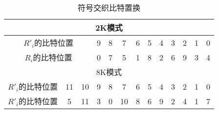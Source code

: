 \begin{table}[!htbp]
	\centering
	\caption{符号交织比特置换}
	\begin{tabular}{|c|c|c|c|c|c|c|c|c|c|c|c|c|}
	\hline\hline
	\multicolumn{13}{|c|}{2K模式} \\
	\hline
	\multicolumn{3}{|c|}{$R'_i$的比特位置} & 9 & 8 & 7 & 6 & 5 & 4 & 3 & 2 & 1 & 0 \\
	\hline
	\multicolumn{3}{|c|}{$R_i$的比特位置} & 0 & 7 & 5 & 1 & 8 & 2 & 6 & 9 & 3 & 4 \\
	\hline
	\multicolumn{13}{|c|}{8K模式} \\
	\hline
	$R'_i$的比特位置 & 11 & 10 & 9 & 8 & 7 & 6 & 5 & 4 & 3 & 2 & 1 & 0 \\
	\hline
	$R'_i$的比特位置 & 5 & 11 & 3 & 0 & 10 & 8 & 6 & 9 & 2 & 4 & 1 & 7 \\
	\hline\hline
	\end{tabular}
	\label{table:symbol_interleaver_bit_replace}
\end{table}

\endinput